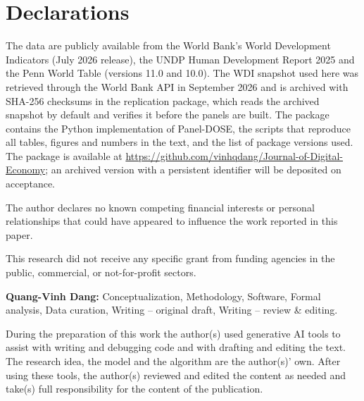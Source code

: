 \documentclass[pdflatex,sn-basic]{sn-jnl}%
\theoremstyle{thmstyleone}
\theoremstyle{thmstyletwo}
\newif\ifblind
\begin{document}
\section*{Declarations}

The data are publicly available from the World Bank's World Development Indicators (July 2026 release), the UNDP Human Development Report 2025 and the Penn World Table (versions 11.0 and 10.0). The WDI snapshot used here was retrieved through the World Bank API in September 2026 and is archived with SHA-256 checksums in the replication package, which reads the archived snapshot by default and verifies it before the panels are built. The package contains the Python implementation of Panel-DOSE, the scripts that reproduce all tables, figures and numbers in the text, and the list of package versions used.
\ifblind The package is available to the editor and reviewers; its location is given on the title page to preserve anonymity.\else The package is available at \url{https://github.com/vinhqdang/Journal-of-Digital-Economy}; an archived version with a persistent identifier will be deposited on acceptance.\fi

\ifblind\else

The author declares no known competing financial interests or personal relationships that could have appeared to influence the work reported in this paper.

This research did not receive any specific grant from funding agencies in the public, commercial, or not-for-profit sectors.

\textbf{Quang-Vinh Dang:} Conceptualization, Methodology, Software, Formal analysis, Data curation, Writing -- original draft, Writing -- review \& editing.
\fi

During the preparation of this work the author(s) used generative AI tools to assist with writing and debugging code and with drafting and editing the text. The research idea, the model and the algorithm are the author(s)' own. After using these tools, the author(s) reviewed and edited the content as needed and take(s) full responsibility for the content of the publication.
\end{document}
